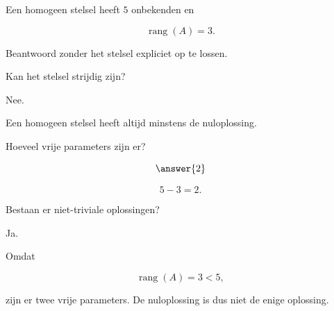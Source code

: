 \documentclass{ximera}
\begin{document}
\begin{oefening}{\oefU}

Een homogeen stelsel heeft \(5\) onbekenden en

\[
\operatorname{rang}(A)=3.
\]

Beantwoord zonder het stelsel expliciet op te lossen.

\begin{question}

Kan het stelsel strijdig zijn?

\begin{multipleChoice}
\end{multipleChoice}

\begin{oplossing}

Nee.

Een homogeen stelsel heeft altijd minstens de nuloplossing.

\end{oplossing}

\end{question}


\begin{question}

Hoeveel vrije parameters zijn er?

\[
\answer{2}
\]

\begin{oplossing}

\[
5-3=2.
\]

\end{oplossing}

\end{question}


\begin{question}

Bestaan er niet-triviale oplossingen?

\begin{multipleChoice}
\end{multipleChoice}

\begin{oplossing}

Ja.

Omdat

\[
\operatorname{rang}(A)=3<5,
\]

zijn er twee vrije parameters. De nuloplossing is dus niet de enige
oplossing.

\end{oplossing}

\end{question}

\end{oefening}
\end{document}
